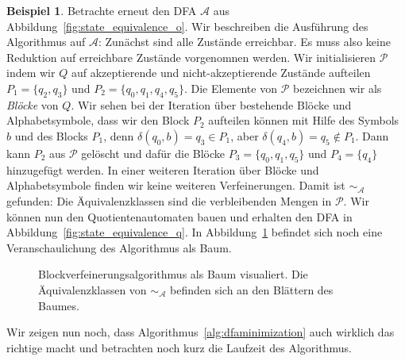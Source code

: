 \documentclass[11pt, a4paper]{article}
\theoremstyle{definition}
\newtheorem{example}[definition]{Beispiel}
\theoremstyle{plain}
\numberwithin{equation}{section}
\begin{document}
\begin{example}
	Betrachte erneut den DFA $\mathcal{A}$ aus Abbildung~\ref{fig:state_equivalence_o}. Wir beschreiben die Ausführung des Algorithmus auf $\mathcal{A}$:
	Zunächst sind alle Zustände erreichbar. Es muss also keine Reduktion auf erreichbare Zustände vorgenomnen werden. Wir initialisieren $\mathcal{P}$ indem wir $Q$ auf akzeptierende und nicht-akzeptierende Zustände aufteilen $P_1 = \{q_2, q_3\}$ und $P_2 = \{q_0, q_1, q_4, q_5\}$. Die Elemente von $\mathcal{P}$ bezeichnen wir als \textit{Blöcke} von $Q$. Wir sehen bei der Iteration über bestehende Blöcke und Alphabetsymbole, dass wir den Block $P_2$ aufteilen können mit Hilfe des Symbols $b$ und des Blocks $P_1$, denn $\delta(q_0, b) = q_3 \in P_1$, aber $\delta(q_4, b) = q_5 \notin P_1$. Dann kann $P_2$ aus $\mathcal{P}$ gelöscht und dafür die Blöcke $P_3 = \{q_0, q_1, q_5\}$ und $P_4 = \{q_4\}$ hinzugefügt werden. In einer weiteren Iteration über Blöcke und Alphabetsymbole finden wir keine weiteren Verfeinerungen. Damit ist $\sim_\mathcal{A}$ gefunden: Die Äquivalenzklassen sind die verbleibenden Mengen in $\mathcal{P}$. Wir können nun den Quotientenautomaten bauen und erhalten den DFA in Abbildung~\ref{fig:state_equivalence_q}. In Abbildung~\ref{fig:blockrefinement} befindet sich noch eine Veranschaulichung des Algorithmus als Baum. 
\end{example}
\begin{figure}
	\centering
	
	\caption{Blockverfeinerungsalgorithmus als Baum visualiert. Die Äquivalenzklassen von $\sim_\mathcal{A}$ befinden sich an den Blättern des Baumes.}
	\label{fig:blockrefinement}
\end{figure}
Wir zeigen nun noch, dass Algorithmus~\ref{alg:dfaminimization} auch wirklich das richtige macht und betrachten noch kurz die Laufzeit des Algorithmus.
\end{document}
